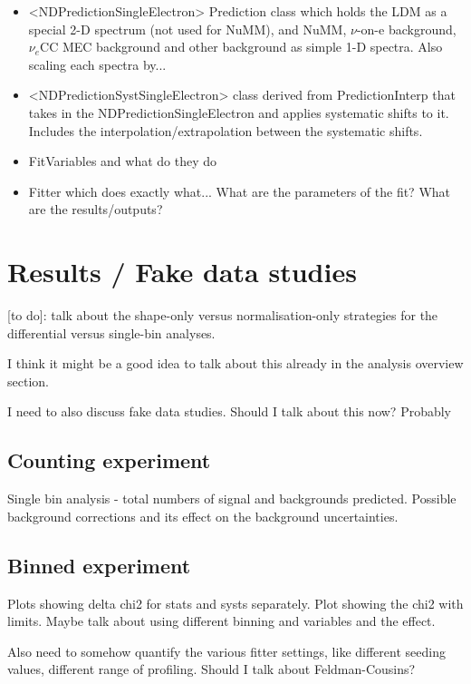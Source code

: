 \documentclass[12pt]{article}
\begin{document}
\begin{itemize}
\item <NDPredictionSingleElectron> Prediction class which holds the LDM as a special 2-D spectrum (not used for NuMM), and NuMM, $\nu$-on-e background, $\nu_e$CC MEC background and other background as simple 1-D spectra. Also scaling each spectra by...
\item <NDPredictionSystSingleElectron> class derived from PredictionInterp that takes in the NDPredictionSingleElectron and applies systematic shifts to it. Includes the interpolation/extrapolation between the systematic shifts.
\item FitVariables and what do they do
\item Fitter which does exactly what... What are the parameters of the fit? What are the results/outputs?
\end{itemize}

\section{Results / Fake data studies}
[to do]: talk about the shape-only versus normalisation-only strategies for the differential versus single-bin analyses.

I think it might be a good idea to talk about this already in the analysis overview section.

I need to also discuss fake data studies. Should I talk about this now? Probably

\subsection{Counting experiment}
Single bin analysis - total numbers of signal and backgrounds predicted. Possible background corrections and its effect on the background uncertainties. 

\subsection{Binned experiment}
Plots showing delta chi2 for stats and systs separately. Plot showing the chi2 with limits. Maybe talk about using different binning and variables and the effect.

Also need to somehow quantify the various fitter settings, like different seeding values, different range of profiling. Should I talk about Feldman-Cousins? 
\end{document}
